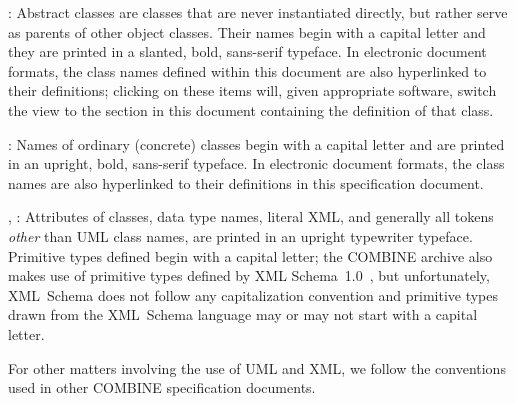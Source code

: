 \begin{description} 

\item {}: Abstract classes are classes that 
are never instantiated directly, but rather serve as parents of other 
object classes. Their names begin with a capital letter and they are 
printed in a slanted, bold, sans-serif typeface. In electronic document 
formats, the class names defined within this document are also 
hyperlinked to their definitions; clicking on these items will, given 
appropriate software, switch the view to the section in this document 
containing the definition of that class. 

\item {}: Names of ordinary (concrete) classes begin with a 
capital letter and are printed in an upright, bold, sans-serif typeface. 
In electronic document formats, the class names are also hyperlinked to 
their definitions in this specification document. 

\item {}, : Attributes of classes, data 
type names, literal XML, and generally all tokens \emph{other} than 
UML class names, are printed in an upright typewriter typeface. 
Primitive types defined begin with a capital letter; the COMBINE archive
also makes use of primitive types defined by XML 
Schema~1.0~\citep{biron:2000,fallside:2000,thompson:2000}, but 
unfortunately, XML~Schema does not follow any capitalization convention 
and primitive types drawn from the XML~Schema language may or may not 
start with a capital letter. 

\end{description} 

For other matters involving the use of UML and XML, we follow the 
conventions used in other COMBINE specification documents. 

